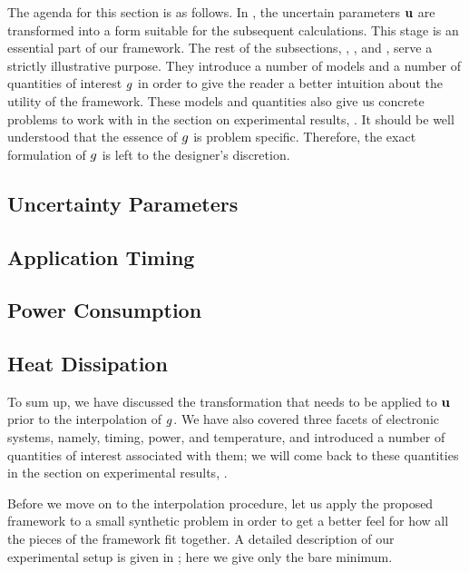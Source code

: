 The agenda for this section is as follows. In , the uncertain
parameters $\mathbf{u}$ are transformed into a form suitable for the subsequent
calculations. This stage is an essential part of our framework. The rest of the
subsections, , , and , serve a strictly
illustrative purpose. They introduce a number of models and a number of
quantities of interest $g$ in order to give the reader a better intuition about
the utility of the framework. These models and quantities also give us concrete
problems to work with in the section on experimental results,
. It should be well understood that the essence of $g$ is
problem specific. Therefore, the exact formulation of $g$ is left to the
designer's discretion.

\subsection{Uncertainty Parameters} 



\subsection{Application Timing} 


\subsection{Power Consumption} 


\subsection{Heat Dissipation} 


To sum up, we have discussed the transformation that needs to be applied to
$\mathbf{u}$ prior to the interpolation of $g$. We have also covered three facets of
electronic systems, namely, timing, power, and temperature, and introduced a
number of quantities of interest associated with them; we will come back to
these quantities in the section on experimental results, .

Before we move on to the interpolation procedure, let us apply the proposed
framework to a small synthetic problem in order to get a better feel for how all
the pieces of the framework fit together. A detailed description of our
experimental setup is given in ; here we give only the bare
minimum.

